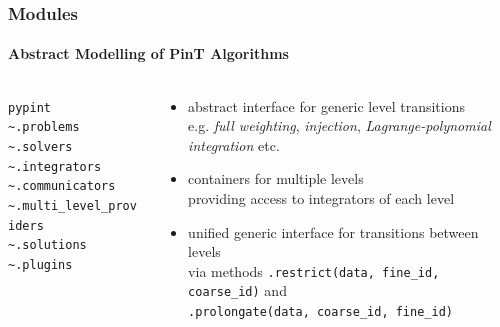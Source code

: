 \documentclass[%
  english,
  hyperref={pdfpagelabels=false},
  aspectratio=1610]{beamer}
\begin{document}
\begin{frame}
  \frametitle{Modules}
  \framesubtitle{Abstract Modelling of PinT Algorithms}
  \vspace{-5em}
  \begin{columns}[T]
    \begin{column}{5cm}
      \color{fzjblue50}%
      \texttt{pypint}\\
      \color{fzjgray30}%
      \hspace{0.75em}\texttt{\textasciitilde.problems}\\
      \hspace{0.75em}\texttt{\textasciitilde.solvers}\\
      \hspace{0.75em}\texttt{\textasciitilde.integrators}\\
      \hspace{0.75em}\texttt{\textasciitilde.communicators}\\
      \color{fzjblue50}%
      \hspace{0.75em}\texttt{\textasciitilde.multi\_level\_providers}\\
      \color{fzjgray30}%
      \hspace{0.75em}\texttt{\textasciitilde.solutions}\\
      \hspace{0.75em}\texttt{\textasciitilde.plugins}
    \end{column}
    \begin{column}{10cm}
      \begin{itemize}
        \item abstract interface for generic level transitions\\
          {\scriptsize e.g. \emph{full weighting}, \emph{injection}, \emph{Lagrange-polynomial integration} etc.\\}
        \item containers for multiple levels\\
          {\scriptsize providing access to integrators of each level\\}
        \item unified generic interface for transitions between levels\\
          {\scriptsize via methods \texttt{.restrict(data, fine\_id, coarse\_id)} and\\[-0.5em]
           \texttt{.prolongate(data, coarse\_id, fine\_id)}}
      \end{itemize}
      

\end{column}
\end{columns}
\end{frame}
\end{document}

